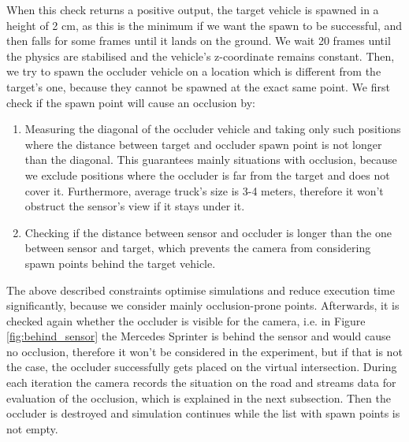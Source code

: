 When this check returns a positive output, the target vehicle is spawned in a height of 2 cm, as this is the minimum if we want the spawn to be successful, and then falls for some frames until it lands on the ground. We wait 20 frames until the physics are stabilised and the vehicle's z-coordinate remains constant. Then, we try to spawn the occluder vehicle on a location which is different from the target's one, because they cannot be spawned at the exact same point. We first check if the spawn point will cause an occlusion by:
\begin{enumerate}
    \item Measuring the diagonal of the occluder vehicle and taking only such positions where the distance between target and occluder spawn point is not longer than the diagonal. This guarantees mainly situations with occlusion, because we exclude positions where the occluder is far from the target and does not cover it. Furthermore, average truck's size is 3-4 meters, therefore it won't obstruct the sensor's view if it stays under it.
    \item Checking if the distance between sensor and occluder is longer than the one between sensor and target, which prevents the camera from considering spawn points behind the target vehicle.
\end{enumerate}
The above described constraints optimise simulations and reduce execution time significantly, because we consider mainly occlusion-prone points. Afterwards, it is checked again whether the occluder is visible for the camera, i.e. in Figure \ref{fig:behind_sensor} the Mercedes Sprinter is behind the sensor and would cause no occlusion, therefore it won't be considered in the experiment, but if that is not the case, the occluder successfully gets placed on the virtual intersection. During each iteration the camera records the situation on the road and streams data for evaluation of the occlusion, which is explained in the next subsection. Then the occluder is destroyed and simulation continues while the list with spawn points is not empty.

